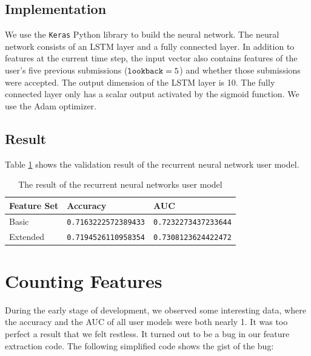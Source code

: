     \subsection{Implementation}

        We use the \verb|Keras|\cite{chollet2015keras} Python library to build the neural network.
        The neural network consists of an LSTM layer and a fully connected layer.
        In addition to features at the current time step,
        the input vector also contains features of the user's five previous submissions ($\verb|lookback| = 5$)
        and whether those submissions were accepted.
        The output dimension of the LSTM layer is 10.
        The fully connected layer only has a scalar output activated by the sigmoid function.
        We use the Adam optimizer\cite{kingma_adam:_2014}.

    \subsection{Result}

        Table \ref{table:rnn result} shows the validation result of the recurrent neural network user model.

        \begin{table}[hpbt]
        \centering
        \begin{tabular}{lll}
            \hline
            Feature Set & Accuracy & AUC \\
            \hline
            Basic    & \verb|0.7163222572389433| & \verb|0.7232273437233644| \\
            Extended & \verb|0.7194526110958354| & \verb|0.7308123624422472| \\
            \hline
        \end{tabular}
        \caption{The result of the recurrent neural networks user model}
        \label{table:rnn result}
        \end{table}

\section{Counting Features}

    During the early stage of development, we observed some interesting data,
    where the accuracy and the AUC of all user models were both nearly 1.
    It was too perfect a result that we felt restless.
    It turned out to be a bug in our feature extraction code.
    The following simplified code shows the gist of the bug:

